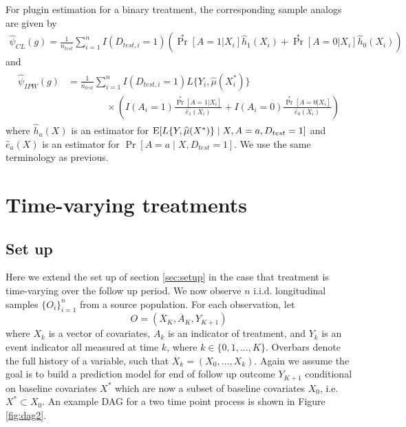     For plugin estimation for a binary treatment, the corresponding sample analogs are given by
    \begin{align}
        \widehat\psi_{CL}(g) = \frac{1}{n_{test}} \sum_{i=1}^n I(D_{test,i}=1) \left( \operatorname{Pr}^*[A=1|X_i] \widehat  h_{1}(X_i) + \operatorname{Pr}^*[A=0|X_i] \widehat  h_{0}(X_i) \right)
    \end{align}
    and 
    \begin{align}
        \begin{split}
        \widehat\psi_{IPW}(g) &= \frac{1}{n_{test}} \sum_{i=1}^n I(D_{test,i}=1)  L\{Y_i, \widehat{\mu}(X^*_i)\} \\
        & \qquad \qquad \times \left( I(A_i = 1)\frac{\operatorname{Pr}^*[A=1|X_i]}{ \widehat{e}_1(X_i)} + I(A_i = 0) \frac{\operatorname{Pr}^*[A=0|X_i]}{ \widehat{e}_0(X_i)} \right)
        \end{split}
    \end{align}
     where $\widehat{h}_a(X)$ is an estimator for $\operatorname{E}[L\{Y, \widehat{\mu}(X^*)\}\mid X,A = a, D_{test} = 1]$ and $\widehat{e}_a(X)$ is an estimator for $\Pr[A = a \mid X,D_{test} = 1]$. We use the same terminology as previous.



\newpage
\section{Time-varying treatments}\label{sec:timevarying}
\subsection{Set up}
Here we extend the set up of section \ref{sec:setup} in the case that treatment is time-varying over the follow up period. We now observe $n$ i.i.d. longitudinal samples $\{O_i\}_{i=1}^n$ from a source population. For each observation, let 
\[O =(\overline{X}_K, \overline{A}_K, Y_{K+1})\]
where $X_k$ is a vector of covariates, $A_k$ is an indicator of treatment, and $Y_k$ is an event indicator all measured at time $k$, where $k \in \{0,1,\ldots, K\}$. Overbars denote the full history of a variable, such that $\overline{X}_k = (X_0,\dots, X_k)$. Again we assume the goal is to build a prediction model for end of follow up outcome $Y_{K+1}$ conditional on baseline covariates $X^*$ which are now a subset of baseline covariates $X_0$, i.e. $X^* \subset X_0$. An example DAG for a two time point process is shown in Figure \ref{fig:dag2}.

